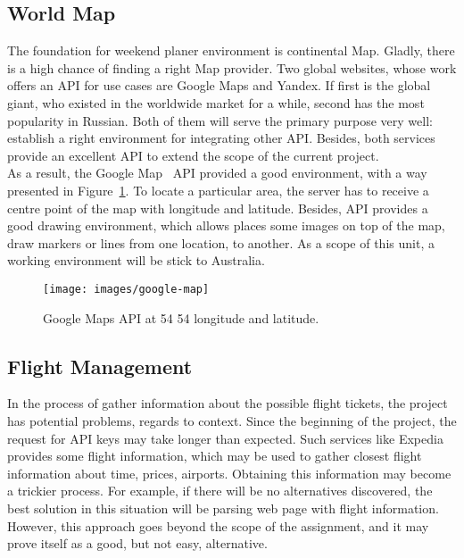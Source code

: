 \documentclass[12pt]{article}
\numberwithin{equation}{section} %
\numberwithin{figure}{section} %
\numberwithin{table}{section} %
\begin{document}
	\subsection{World Map}	
		The foundation for weekend planer environment is continental Map. Gladly, there is a high chance of finding a right Map provider. Two global websites, whose work offers an API for use cases are Google Maps and Yandex. If first is the global giant, who existed in the worldwide market for a while, second has the most popularity in Russian. Both of them will serve the primary purpose very well: establish a right environment for integrating other API. Besides, both services provide an excellent API to extend the scope of the current project. \\
		
		As a result, the Google Map~\cite{noauthor_google_nodate} API provided a good environment, with a way presented in Figure~\ref{fig:gmaps}. To locate a particular area, the server has to receive a centre point of the map with longitude and latitude. Besides, API provides a good drawing environment, which allows places some images on top of the map, draw markers or lines from one location, to another. As a scope of this unit, a working environment will be stick to Australia.
		
		\begin{figure}[H]
			\centering        
			\texttt{[image: images/google-map]}
			\caption{Google Maps API at 54 54 longitude and latitude.}
			\label{fig:gmaps}
		\end{figure}
		
	\subsection{Flight Management}	
		In the process of gather information about the possible flight tickets, the project has potential problems, regards to context. Since the beginning of the project, the request for API keys may take longer than expected. Such services like Expedia~\cite{noauthor_expedia_nodate} provides some flight information, which may be used to gather closest flight information about time, prices, airports. Obtaining this information may become a trickier process. For example, if there will be no alternatives discovered, the best solution in this situation will be parsing web page with flight information. However, this approach goes beyond the scope of the assignment, and it may prove itself as a good, but not easy, alternative.\\
		
\end{document}
